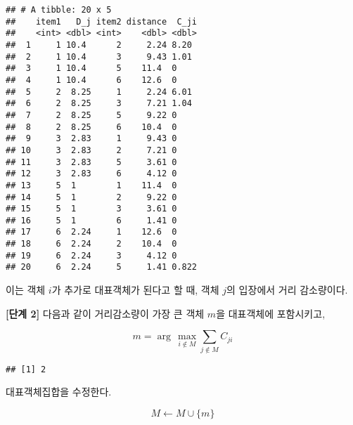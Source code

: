 \documentclass[]{book}
\newenvironment{Shaded}{\begin{snugshade}}{\end{snugshade}}
\newcommand{\DataTypeTok}[1]{\textcolor[rgb]{0.13,0.29,0.53}{#1}}
\newcommand{\DecValTok}[1]{\textcolor[rgb]{0.00,0.00,0.81}{#1}}
\newcommand{\KeywordTok}[1]{\textcolor[rgb]{0.13,0.29,0.53}{\textbf{#1}}}
\newcommand{\NormalTok}[1]{#1}
\newcommand{\OperatorTok}[1]{\textcolor[rgb]{0.81,0.36,0.00}{\textbf{#1}}}
\newcommand{\StringTok}[1]{\textcolor[rgb]{0.31,0.60,0.02}{#1}}
\begin{document}
\begin{verbatim}
## # A tibble: 20 x 5
##    item1   D_j item2 distance  C_ji
##    <int> <dbl> <int>    <dbl> <dbl>
##  1     1 10.4      2     2.24 8.20 
##  2     1 10.4      3     9.43 1.01 
##  3     1 10.4      5    11.4  0    
##  4     1 10.4      6    12.6  0    
##  5     2  8.25     1     2.24 6.01 
##  6     2  8.25     3     7.21 1.04 
##  7     2  8.25     5     9.22 0    
##  8     2  8.25     6    10.4  0    
##  9     3  2.83     1     9.43 0    
## 10     3  2.83     2     7.21 0    
## 11     3  2.83     5     3.61 0    
## 12     3  2.83     6     4.12 0    
## 13     5  1        1    11.4  0    
## 14     5  1        2     9.22 0    
## 15     5  1        3     3.61 0    
## 16     5  1        6     1.41 0    
## 17     6  2.24     1    12.6  0    
## 18     6  2.24     2    10.4  0    
## 19     6  2.24     3     4.12 0    
## 20     6  2.24     5     1.41 0.822
\end{verbatim}

이는 객체 \(i\)가 추가로 대표객체가 된다고 할 때, 객체 \(j\)의 입장에서 거리 감소량이다.

\textbf{{[}단계 2{]}} 다음과 같이 거리감소량이 가장 큰 객체 \(m\)을 대표객체에 포함시키고,

\begin{equation*}
m = \arg\,\max_{i \notin M} \sum_{j \notin M} C_{ji}
\end{equation*}

\begin{Shaded}
\end{Shaded}

\begin{verbatim}
## [1] 2
\end{verbatim}

대표객체집합을 수정한다.

\begin{equation*}
M \leftarrow M \cup \{m\}
\end{equation*}
\end{document}
